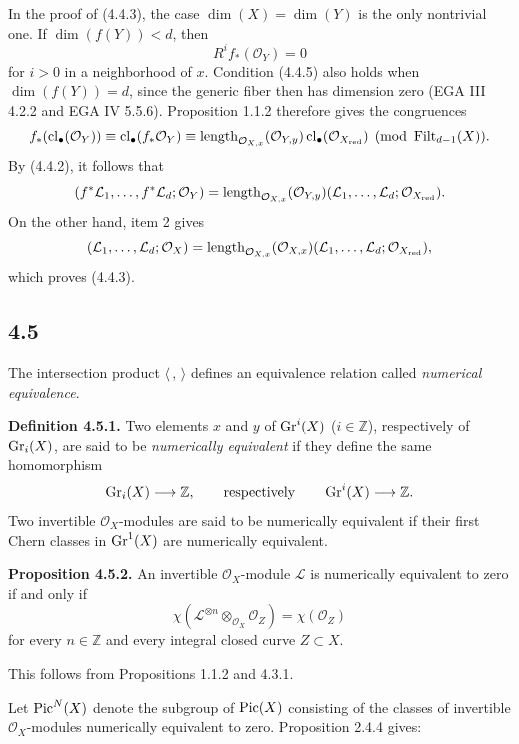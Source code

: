 In the proof of (4.4.3), the case $\dim(X)=\dim(Y)$ is the only nontrivial
one. If $\dim(f(Y))<d$, then
\begin{equation}\tag{4.4.5}
R^if_*(\mathcal O_Y)=0
\end{equation}
for $i>0$ in a neighborhood of $x$. Condition (4.4.5) also holds when
$\dim(f(Y))=d$, since the generic fiber then has dimension zero (EGA III
4.2.2 and EGA IV 5.5.6). Proposition 1.1.2 therefore gives the congruences
\[
f_*(\operatorname{cl}_\bullet(\mathcal O_Y))
\equiv\operatorname{cl}_\bullet(f_*\mathcal O_Y)
\equiv\operatorname{length}_{\mathcal O_{X,x}}(\mathcal O_{Y,y})
\operatorname{cl}_\bullet(\mathcal O_{X_{\mathrm{red}}})
\pmod{\operatorname{Filt}_{d-1}(X)}.
\]
By (4.4.2), it follows that
\[
(f^*\mathcal L_1,\ldots,f^*\mathcal L_d;\mathcal O_Y)
=\operatorname{length}_{\mathcal O_{X,x}}(\mathcal O_{Y,y})
(\mathcal L_1,\ldots,\mathcal L_d;\mathcal O_{X_{\mathrm{red}}}).
\]
On the other hand, item 2 gives
\[
(\mathcal L_1,\ldots,\mathcal L_d;\mathcal O_X)
=\operatorname{length}_{\mathcal O_{X,x}}(\mathcal O_{X,x})
(\mathcal L_1,\ldots,\mathcal L_d;\mathcal O_{X_{\mathrm{red}}}),
\]
which proves (4.4.3).

\subsection*{4.5}
The intersection product $\langle\, ,\,\rangle$ defines an equivalence
relation called \emph{numerical equivalence}.

\textbf{Definition 4.5.1.}
Two elements $x$ and $y$ of $\operatorname{Gr}^i(X)$ ($i\in\mathbb Z$), respectively of
$\operatorname{Gr}_i(X)$, are said to be \emph{numerically equivalent} if they define the
same homomorphism
\[
\operatorname{Gr}_i(X)\longrightarrow\mathbb Z,
\qquad\text{respectively}\qquad
\operatorname{Gr}^i(X)\longrightarrow\mathbb Z.
\]
Two invertible $\mathcal O_X$-modules are said to be numerically equivalent
if their first Chern classes in $\operatorname{Gr}^1(X)$ are numerically equivalent.

\textbf{Proposition 4.5.2.}
An invertible $\mathcal O_X$-module $\mathcal L$ is numerically equivalent to
zero if and only if
\begin{equation}\tag{4.5.3}
\chi(\mathcal L^{\otimes n}\otimes_{\mathcal O_X}\mathcal O_Z)
=\chi(\mathcal O_Z)
\end{equation}
for every $n\in\mathbb Z$ and every integral closed curve $Z\subset X$.

This follows from Propositions 1.1.2 and 4.3.1.

Let $\operatorname{Pic}^N(X)$ denote the subgroup of $\operatorname{Pic}(X)$ consisting of the classes of
invertible $\mathcal O_X$-modules numerically equivalent to zero.
Proposition 2.4.4 gives:

